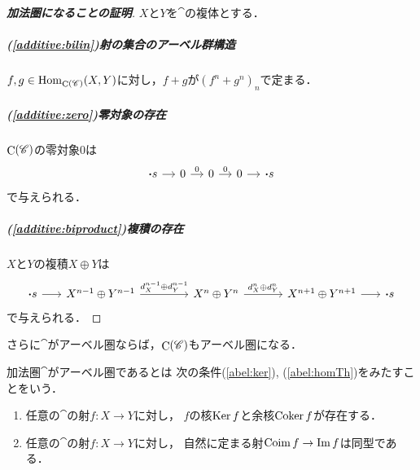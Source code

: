 \begin{proof}[\textbf{加法圏になることの証明}]
    $X$と$Y$を$\cat$の複体とする．
    \subparagraph*{(\ref{additive:bilin})射の集合のアーベル群構造}
    $f,g\in\mathop{\mathrm{Hom}}\nolimits_{\mathop{\mathrm{C}}\nolimits(\mathscr{C})}(X,Y)$に対し，$f+g$が$(f^n+g^n)_n$で定まる．
    \subparagraph*{(\ref{additive:zero})零対象の存在}
    $\mathop{\mathrm{C}}\nolimits(\mathscr{C})$の零対象0は
    \begin{equation*}%
        \begin{tikzcd}[column sep=0.4cm]
            \boldsymbol{\cdot}s
            \arrow[r]
            &
            0
            \arrow[r,"0"] 
            &%
            0
            \arrow[r,"0"]
            &%
            0
            \arrow[r, ""] 
            &%
            \boldsymbol{\cdot}s
        \end{tikzcd}
    \end{equation*}
    で与えられる．
    \subparagraph*{(\ref{additive:biproduct})複積の存在}    
    $X$と$Y$の複積$X\oplus Y$は
    \begin{equation*}%
        \begin{tikzcd}[column sep=1.2cm]
            \boldsymbol{\cdot}s
            \arrow[r]
            &[-0.6cm]
            X^{n-1}\oplus Y^{n-1}
            \arrow[r,"d_X^{n-1}\oplus d_Y^{n-1}"] 
            &[+0.3cm]%
            X^n\oplus Y^{n}
            \arrow[r,"d_X^{n}\oplus d_Y^{n}"]
            &%
            X^{n+1}\oplus Y^{n+1}
            \arrow[r, ""] 
            &[-0.6cm]%
            \boldsymbol{\cdot}s
        \end{tikzcd}
    \end{equation*}
    で与えられる．
\end{proof}

さらに$\cat$がアーベル圏ならば，$\mathop{\mathrm{C}}\nolimits(\mathscr{C})$もアーベル圏になる．
\begin{Attention*}
    加法圏$\cat$がアーベル圏であるとは
    次の条件(\ref{abel:ker}), (\ref{abel:homTh})をみたすことをいう．
    \begin{enumerate}
        \renewcommand{\labelenumi}{({\arabic{enumi}})}
        \setcounter{enumi}{3}
        \item 任意の$\cat$の射$f\colon X\to Y$に対し，
        $f$の核$\mathop{\mathrm{Ker}}\nolimits{f}$と余核$\mathop{\mathrm{Coker}}\nolimits f$が存在する．\label{abel:ker}
        \item 任意の$\cat$の射$f\colon X\to Y$に対し，
        自然に定まる射$\mathop{\mathrm{Coim}}\nolimits f\to\mathop{\mathrm{Im}}\nolimits f$は同型である．\label{abel:homTh}
    \end{enumerate}
\end{Attention*}

